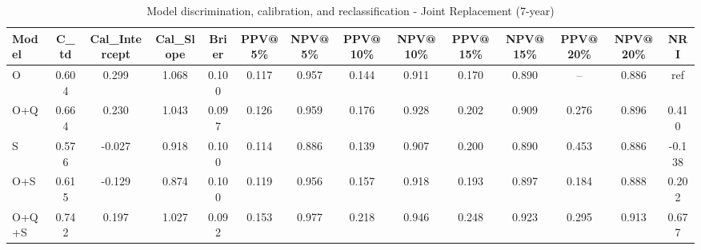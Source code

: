 \begin{table}[htbp]
\centering
\small
\caption{Model discrimination, calibration, and reclassification - Joint Replacement (7-year)}
\label{tab:perf_joint_7y}
\begin{tabular}{lccccccccccccc}
\toprule
Model & C\_td & Cal\_Intercept & Cal\_Slope & Brier & PPV@5\% & NPV@5\% & PPV@10\% & NPV@10\% & PPV@15\% & NPV@15\% & PPV@20\% & NPV@20\% & NRI \\
\midrule
O & 0.604 & 0.299 & 1.068 & 0.100 & 0.117 & 0.957 & 0.144 & 0.911 & 0.170 & 0.890 & -- & 0.886 & ref \\
O+Q & 0.664 & 0.230 & 1.043 & 0.097 & 0.126 & 0.959 & 0.176 & 0.928 & 0.202 & 0.909 & 0.276 & 0.896 & 0.410 \\
S & 0.576 & -0.027 & 0.918 & 0.100 & 0.114 & 0.886 & 0.139 & 0.907 & 0.200 & 0.890 & 0.453 & 0.886 & -0.138 \\
O+S & 0.615 & -0.129 & 0.874 & 0.100 & 0.119 & 0.956 & 0.157 & 0.918 & 0.193 & 0.897 & 0.184 & 0.888 & 0.202 \\
O+Q+S & 0.742 & 0.197 & 1.027 & 0.092 & 0.153 & 0.977 & 0.218 & 0.946 & 0.248 & 0.923 & 0.295 & 0.913 & 0.677 \\
\bottomrule
\end{tabular}
\end{table}